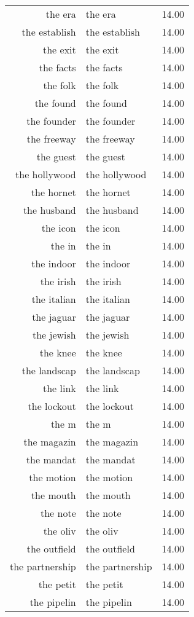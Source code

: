 \begin{table}[ht]
\begin{tabular}{rlr}
  the era & the era & 14.00 \\ 
  the establish & the establish & 14.00 \\ 
  the exit & the exit & 14.00 \\ 
  the facts & the facts & 14.00 \\ 
  the folk & the folk & 14.00 \\ 
  the found & the found & 14.00 \\ 
  the founder & the founder & 14.00 \\ 
  the freeway & the freeway & 14.00 \\ 
  the guest & the guest & 14.00 \\ 
  the hollywood & the hollywood & 14.00 \\ 
  the hornet & the hornet & 14.00 \\ 
  the husband & the husband & 14.00 \\ 
  the icon & the icon & 14.00 \\ 
  the in & the in & 14.00 \\ 
  the indoor & the indoor & 14.00 \\ 
  the irish & the irish & 14.00 \\ 
  the italian & the italian & 14.00 \\ 
  the jaguar & the jaguar & 14.00 \\ 
  the jewish & the jewish & 14.00 \\ 
  the knee & the knee & 14.00 \\ 
  the landscap & the landscap & 14.00 \\ 
  the link & the link & 14.00 \\ 
  the lockout & the lockout & 14.00 \\ 
  the m & the m & 14.00 \\ 
  the magazin & the magazin & 14.00 \\ 
  the mandat & the mandat & 14.00 \\ 
  the motion & the motion & 14.00 \\ 
  the mouth & the mouth & 14.00 \\ 
  the note & the note & 14.00 \\ 
  the oliv & the oliv & 14.00 \\ 
  the outfield & the outfield & 14.00 \\ 
  the partnership & the partnership & 14.00 \\ 
  the petit & the petit & 14.00 \\ 
  the pipelin & the pipelin & 14.00 \\ 

\end{tabular}
\end{table}
